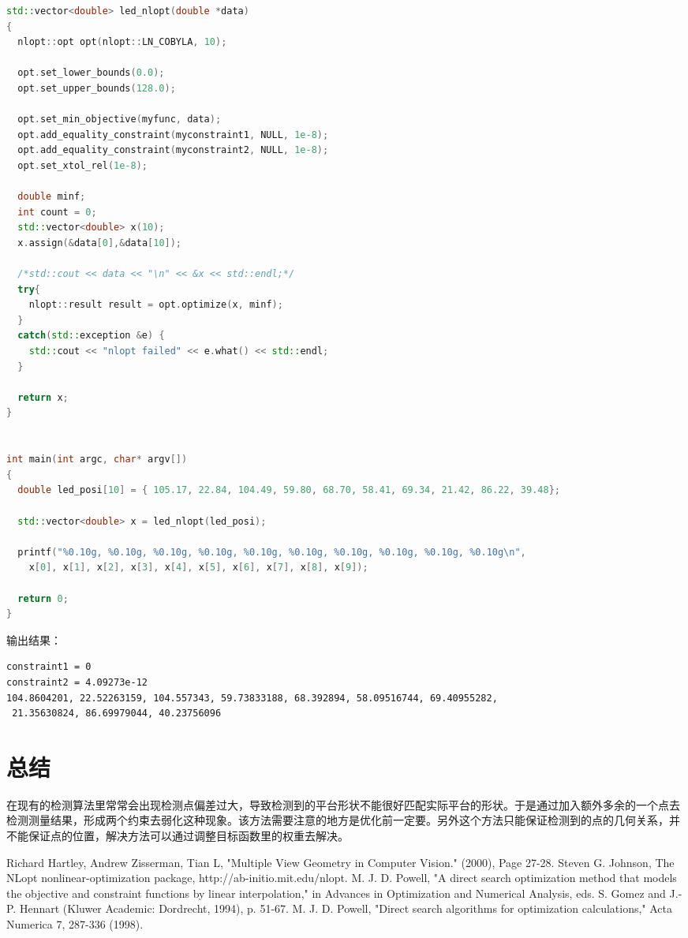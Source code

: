\documentclass[a4paper]{article}
\begin{document}
\begin{CJK*}{UTF8}{gbsn}
\begin{lstlisting}[language=c++]
std::vector<double> led_nlopt(double *data)
{
  nlopt::opt opt(nlopt::LN_COBYLA, 10);

  opt.set_lower_bounds(0.0);
  opt.set_upper_bounds(128.0);

  opt.set_min_objective(myfunc, data);
  opt.add_equality_constraint(myconstraint1, NULL, 1e-8); 
  opt.add_equality_constraint(myconstraint2, NULL, 1e-8);
  opt.set_xtol_rel(1e-8);

  double minf;
  int count = 0;
  std::vector<double> x(10);
  x.assign(&data[0],&data[10]);

  /*std::cout << data << "\n" << &x << std::endl;*/
  try{
    nlopt::result result = opt.optimize(x, minf);
  }
  catch(std::exception &e) {
    std::cout << "nlopt failed" << e.what() << std::endl;
  }

  return x;
}


int main(int argc, char* argv[])
{
  double led_posi[10] = { 105.17, 22.84, 104.49, 59.80, 68.70, 58.41, 69.34, 21.42, 86.22, 39.48};

  std::vector<double> x = led_nlopt(led_posi);
  
  printf("%0.10g, %0.10g, %0.10g, %0.10g, %0.10g, %0.10g, %0.10g, %0.10g, %0.10g, %0.10g\n", 
	x[0], x[1], x[2], x[3], x[4], x[5], x[6], x[7], x[8], x[9]);

  return 0;
}
\end{lstlisting}
输出结果：
\begin{lstlisting}
constraint1 = 0
constraint2 = 4.09273e-12
104.8604201, 22.52263159, 104.557343, 59.73833188, 68.392894, 58.09516744, 69.40955282,
 21.35630824, 86.69979044, 40.23756096
\end{lstlisting}
\section{总结}
在现有的检测算法里常常会出现检测点偏差过大，导致检测到的平台形状不能很好匹配实际平台的形状。于是通过加入额外多余的一个点去检测测量结果，形成两个约束去弱化这种现象。该方法需要注意的地方是优化前一定要{\color{red}{注意匹配好点的位置}}。另外这个方法只能保证检测到的点的几何关系，并不能保证点的位置，解决方法可以通过调整目标函数里的权重去解决。

\begin{thebibliography}{99}  
Richard Hartley, Andrew Zisserman, Tian L, "Multiple View Geometry in Computer Vision." (2000), Page 27-28. 
Steven G. Johnson, The NLopt nonlinear-optimization package, http://ab-initio.mit.edu/nlopt.
M. J. D. Powell, "A direct search optimization method that models the objective and constraint functions by linear interpolation," in Advances in Optimization and Numerical Analysis, eds. S. Gomez and J.-P. Hennart (Kluwer Academic: Dordrecht, 1994), p. 51-67.
M. J. D. Powell, "Direct search algorithms for optimization calculations," Acta Numerica 7, 287-336 (1998).
 
\end{thebibliography}

\end{CJK*}
\end{document}
